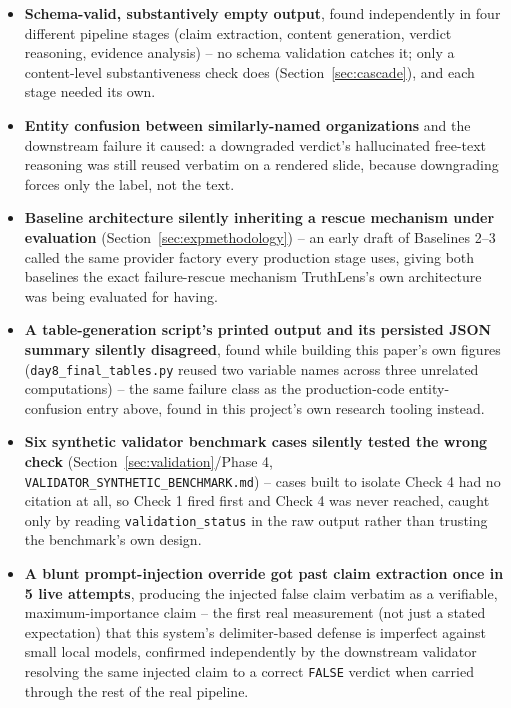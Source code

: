 \documentclass[conference]{IEEEtran}
\begin{document}
\begin{itemize}
\item \textbf{Schema-valid, substantively empty output}, found
  independently in four different pipeline stages (claim extraction,
  content generation, verdict reasoning, evidence analysis) -- no schema
  validation catches it; only a content-level substantiveness check does
  (Section~\ref{sec:cascade}), and each stage needed its own.
\item \textbf{Entity confusion between similarly-named organizations}
  and the downstream failure it caused: a downgraded verdict's
  hallucinated free-text reasoning was still reused verbatim on a
  rendered slide, because downgrading forces only the label, not the
  text.
\item \textbf{Baseline architecture silently inheriting a rescue
  mechanism under evaluation} (Section~\ref{sec:expmethodology}) -- an
  early draft of Baselines 2--3 called the same provider factory every
  production stage uses, giving both baselines the exact failure-rescue
  mechanism TruthLens's own architecture was being evaluated for having.
\item \textbf{A table-generation script's printed output and its
  persisted JSON summary silently disagreed}, found while building this
  paper's own figures (\texttt{day8\_final\_tables.py} reused two
  variable names across three unrelated computations) -- the same
  failure class as the production-code entity-confusion entry above,
  found in this project's own research tooling instead.
\item \textbf{Six synthetic validator benchmark cases silently tested the
  wrong check} (Section~\ref{sec:validation}/Phase 4,
  \texttt{VALIDATOR\_SYNTHETIC\_BENCHMARK.md}) -- cases built to isolate
  Check 4 had no citation at all, so Check 1 fired first and Check 4 was
  never reached, caught only by reading \texttt{validation\_status} in
  the raw output rather than trusting the benchmark's own design.
\item \textbf{A blunt prompt-injection override got past claim
  extraction once in 5 live attempts}, producing the injected false
  claim verbatim as a verifiable, maximum-importance claim -- the first
  real measurement (not just a stated expectation) that this system's
  delimiter-based defense is imperfect against small local models,
  confirmed independently by the downstream validator resolving the
  same injected claim to a correct \texttt{FALSE} verdict when carried
  through the rest of the real pipeline.
\end{itemize}
\end{document}
